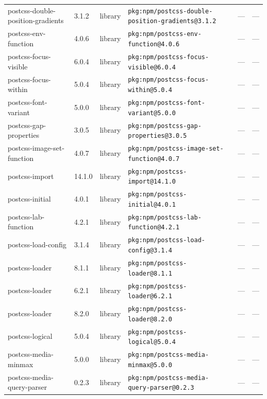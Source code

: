 \documentclass[11pt,a4paper]{article}
\begin{document}
\begin{longtable}{|p{4cm}|p{2cm}|p{1.6cm}|p{5cm}|p{1.5cm}|p{3.5cm}|}
\raggedright postcss-double-position-gradients & 3.1.2 & library & \small\texttt{pkg:npm/postcss-double-position-gradients@3.1.2} & — & \small — \\
\raggedright postcss-env-function & 4.0.6 & library & \small\texttt{pkg:npm/postcss-env-function@4.0.6} & — & \small — \\
\raggedright postcss-focus-visible & 6.0.4 & library & \small\texttt{pkg:npm/postcss-focus-visible@6.0.4} & — & \small — \\
\raggedright postcss-focus-within & 5.0.4 & library & \small\texttt{pkg:npm/postcss-focus-within@5.0.4} & — & \small — \\
\raggedright postcss-font-variant & 5.0.0 & library & \small\texttt{pkg:npm/postcss-font-variant@5.0.0} & — & \small — \\
\raggedright postcss-gap-properties & 3.0.5 & library & \small\texttt{pkg:npm/postcss-gap-properties@3.0.5} & — & \small — \\
\raggedright postcss-image-set-function & 4.0.7 & library & \small\texttt{pkg:npm/postcss-image-set-function@4.0.7} & — & \small — \\
\raggedright postcss-import & 14.1.0 & library & \small\texttt{pkg:npm/postcss-import@14.1.0} & — & \small — \\
\raggedright postcss-initial & 4.0.1 & library & \small\texttt{pkg:npm/postcss-initial@4.0.1} & — & \small — \\
\raggedright postcss-lab-function & 4.2.1 & library & \small\texttt{pkg:npm/postcss-lab-function@4.2.1} & — & \small — \\
\raggedright postcss-load-config & 3.1.4 & library & \small\texttt{pkg:npm/postcss-load-config@3.1.4} & — & \small — \\
\raggedright postcss-loader & 8.1.1 & library & \small\texttt{pkg:npm/postcss-loader@8.1.1} & — & \small — \\
\raggedright postcss-loader & 6.2.1 & library & \small\texttt{pkg:npm/postcss-loader@6.2.1} & — & \small — \\
\raggedright postcss-loader & 8.2.0 & library & \small\texttt{pkg:npm/postcss-loader@8.2.0} & — & \small — \\
\raggedright postcss-logical & 5.0.4 & library & \small\texttt{pkg:npm/postcss-logical@5.0.4} & — & \small — \\
\raggedright postcss-media-minmax & 5.0.0 & library & \small\texttt{pkg:npm/postcss-media-minmax@5.0.0} & — & \small — \\
\raggedright postcss-media-query-parser & 0.2.3 & library & \small\texttt{pkg:npm/postcss-media-query-parser@0.2.3} & — & \small — \\

\end{longtable}
\end{document}
